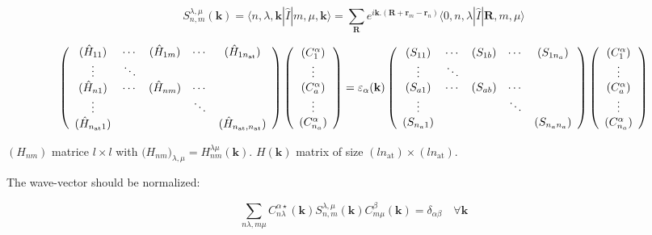 \documentclass{article}
\newcommand{\bra}[1]{\langle #1|}
\newcommand{\ket}[1]{|#1\rangle}
\newcommand{\op}[1]{\hat{#1}}
\begin{document}
\[\displaystyle  S_{n,m}^{\lambda,\mu}(\mathbf{k})=\bra{n,\lambda,\mathbf{k}}\op{I}\ket{ m,\mu,\mathbf{k}}=
\sum_{\mathbf{R}} e^{i\mathbf{k}.(\mathbf{R}+\mathbf{r}_{m}-\mathbf{r}_n)}
\bra{ 0,n,\lambda}\op{I}\ket{\mathbf{R},m,\mu }\]

\noindent
\[ \left( \begin{array}{c c c c c}
(\hat{H}_{1 1}) & \cdots & (\hat{H}_{1 m}) & \cdots & (\hat{H}_{1 n_{\text{at}}}) \\
\vdots & \ddots & & & \\
(\hat{H}_{n 1}) & \cdots & (\hat{H}_{n m}) & \cdots & \\
\vdots & & & \ddots & \\
(\hat{H}_{n_{\text{at}} 1}) & & & & (\hat{H}_{n_{\text{at}}, n_{\text{at}}})
\end{array} \right )
\left( \begin{array}{c}
(C_1^{\alpha}) \\
\vdots \\
(C_{a}^{\alpha}) \\
\vdots \\
(C_{n_a}^{\alpha})
\end{array} \right )= \varepsilon_{\alpha}(\mathbf{k})
\left( \begin{array}{c c c c c}
(S_{1 1}) & \cdots & (S_{1 b}) & \cdots & (S_{1 n_a}) \\
\vdots & \ddots & & & \\
(S_{a 1}) & \cdots & (S_{a b}) & \cdots & \\
\vdots & & & \ddots & \\
(S_{n_a 1 }) & & & & (S_{n_a n_a})
\end{array} \right )
\left( \begin{array}{c}
(C_1^{\alpha}) \\
\vdots \\
(C_{a}^{\alpha}) \\
\vdots \\
(C_{n_a}^{\alpha})
\end{array} \right )
\]


\noindent
$(H_{n m}) $ matrice $l\times l$ with $\Big( H_{n m} \Big)_{\lambda,\mu}=H_{nm}^{\lambda 
\mu}(\mathbf{k})$. $H(\mathbf{k})$ matrix of size $(ln_{\text{at}})\times (ln_{\text{at}})$.

\noindent
The wave-vector should be normalized:

\[ \displaystyle \sum_{n \lambda,m\mu} C_{n \lambda}^{\alpha  \star}(\mathbf{k})S_{n,m}^{\lambda,\mu}(\mathbf{k})C_{m 
\mu}^{\beta}(\mathbf{k})=\delta_{\alpha \beta}
\quad \forall \mathbf{k} \]
\end{document}
